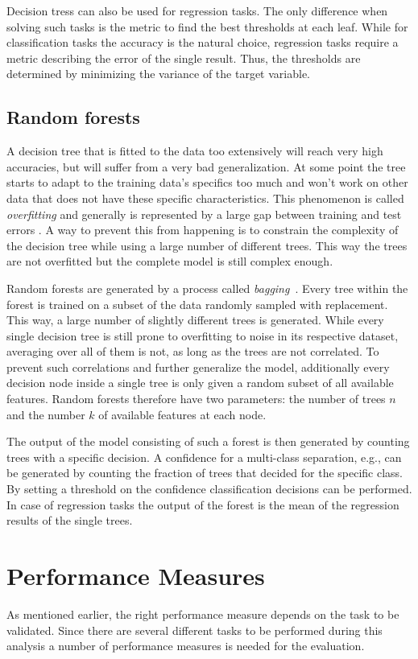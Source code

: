 Decision tress can also be used for regression tasks. The only difference when
solving such tasks is the metric to find the best thresholds at each leaf.
While for classification tasks the accuracy is the natural choice, regression
tasks require a metric describing the error of the single result. Thus, the
thresholds are determined by minimizing the variance of the target variable.

\subsection{Random forests}
%
A decision tree that is fitted to the data too extensively will reach
very high accuracies, but will suffer from a very bad generalization. At some
point the tree starts to adapt to the training data's specifics too much and
won't work on other data that does not have these specific characteristics.
This phenomenon is called \textit{overfitting} and generally is represented by
a large gap between training and test errors \cite{goodfellow}. A way to
prevent this from happening is to constrain the complexity of the decision tree
while using a large number of different trees. This way the trees are not
overfitted but the complete model is still complex enough.

Random forests are generated by a process called
\textit{bagging}~\cite{bagging}. Every tree within the forest is trained on a
subset of the data randomly sampled with replacement. This way, a large number
of slightly different trees is generated. While every single decision tree is
still prone to overfitting to noise in its respective dataset, averaging over
all of them is not, as long as the trees are not correlated. To prevent such
correlations and further generalize the model, additionally every decision node
inside a single tree is only given a random subset of all available features.
Random forests therefore have two parameters: the number of trees $n$ and the
number $k$ of available features at each node.

The output of the model consisting of such a forest is then generated
by counting trees with a specific decision. A confidence for a multi-class
separation, e.g., can be generated by counting the fraction of trees that
decided for the specific class. By setting a threshold on the confidence
classification decisions can be performed. In case of regression tasks the
output of the forest is the mean of the regression results of the single trees.

\section{Performance Measures}
%
As mentioned earlier, the right performance measure depends on the task to be
validated. Since there are several different tasks to be performed during this
analysis a number of performance measures is needed for the evaluation.

